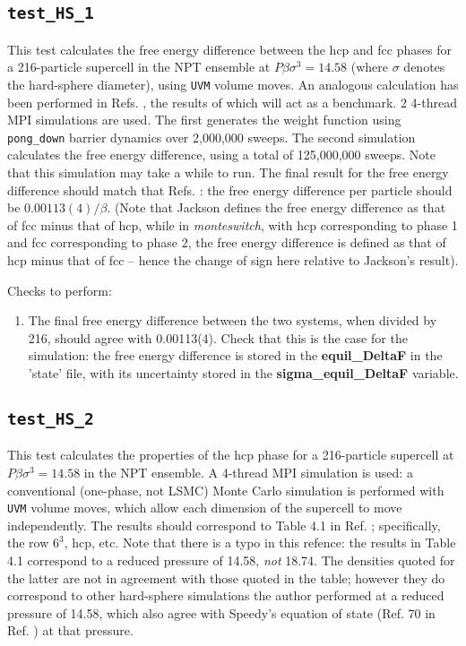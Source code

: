 \documentclass{report}
\begin{document}
\subsection{\texttt{test\_HS\_1}}
This test calculates the free energy difference between the hcp and fcc phases for a 216-particle supercell in the NPT ensemble at
$P\beta\sigma^3=14.58$ (where $\sigma$ denotes the hard-sphere diameter), using \texttt{UVM} volume moves. An analogous calculation
has been performed in Refs. \cite{thesis:Jackson,Bruce_2000}, the results of which will act as a benchmark.
2 4-thread MPI simulations are used. The first generates the weight function using \texttt{pong\_down}
barrier dynamics over 2,000,000 sweeps. The second simulation calculates the free energy difference, using
a total of 125,000,000 sweeps. Note that this simulation may take a while to run. The final result for the free energy difference
should match that Refs. \cite{thesis:Jackson,Bruce_2000}: the free energy difference per particle should be
$0.00113(4)/\beta$. (Note that Jackson defines the free energy difference as that of fcc minus that of hcp,
while in \emph{monteswitch}, with hcp corresponding to phase 1 and fcc corresponding to phase 2, the free energy
difference is defined as that of hcp minus that of fcc -- hence the change of sign here
relative to Jackson's result).

Checks to perform:
\begin{enumerate}
\item
The final free energy difference between the two systems, when divided by 216, should agree with 0.00113(4).
Check that this is the case for the simulation: the free energy difference is stored in the \textbf{equil\_DeltaF}
in the 'state' file, with its uncertainty stored in the \textbf{sigma\_equil\_DeltaF} variable.
\end{enumerate}


\subsection{\texttt{test\_HS\_2}}
This test calculates the properties of the hcp phase for a 216-particle supercell at $P\beta\sigma^3=14.58$ in
the NPT ensemble. A 4-thread MPI simulation is used: a conventional (one-phase, not LSMC) Monte Carlo simulation is
performed with \texttt{UVM} volume moves, which allow each dimension of the supercell to move independently. The
results should correspond to Table 4.1 in Ref. \cite{thesis:Jackson}; specifically, the row $6^3$, hcp, etc. Note
that there is a typo in this refence: the results in Table 4.1 correspond to a reduced pressure of 14.58, \emph{not}
18.74. The densities quoted for the latter are not in agreement with those quoted in the table; however they
do correspond to other hard-sphere simulations the author performed at a reduced pressure of 14.58, which also agree with
Speedy's equation of state (Ref. 70 in Ref. \cite{thesis:Jackson}) at that pressure.
\end{document}
